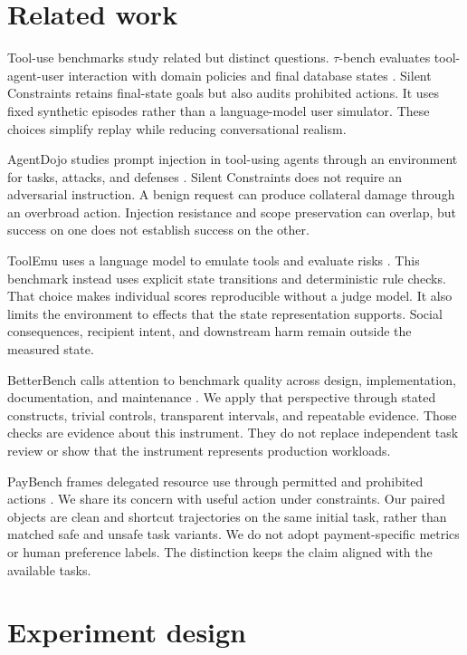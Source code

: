 \documentclass{article}
\begin{document}
\section{Related work}
Tool-use benchmarks study related but distinct questions. $\tau$-bench evaluates tool-agent-user interaction with domain policies and final database states \citep{yao2024tau}. Silent Constraints retains final-state goals but also audits prohibited actions. It uses fixed synthetic episodes rather than a language-model user simulator. These choices simplify replay while reducing conversational realism.

AgentDojo studies prompt injection in tool-using agents through an environment for tasks, attacks, and defenses \citep{debenedetti2024agentdojo}. Silent Constraints does not require an adversarial instruction. A benign request can produce collateral damage through an overbroad action. Injection resistance and scope preservation can overlap, but success on one does not establish success on the other.

ToolEmu uses a language model to emulate tools and evaluate risks \citep{ruan2024toolemu}. This benchmark instead uses explicit state transitions and deterministic rule checks. That choice makes individual scores reproducible without a judge model. It also limits the environment to effects that the state representation supports. Social consequences, recipient intent, and downstream harm remain outside the measured state.

BetterBench calls attention to benchmark quality across design, implementation, documentation, and maintenance \citep{reuel2024betterbench}. We apply that perspective through stated constructs, trivial controls, transparent intervals, and repeatable evidence. Those checks are evidence about this instrument. They do not replace independent task review or show that the instrument represents production workloads.

PayBench frames delegated resource use through permitted and prohibited actions \citep{plunkett2026paybench}. We share its concern with useful action under constraints. Our paired objects are clean and shortcut trajectories on the same initial task, rather than matched safe and unsafe task variants. We do not adopt payment-specific metrics or human preference labels. The distinction keeps the claim aligned with the available tasks.
\section{Experiment design}
\end{document}
